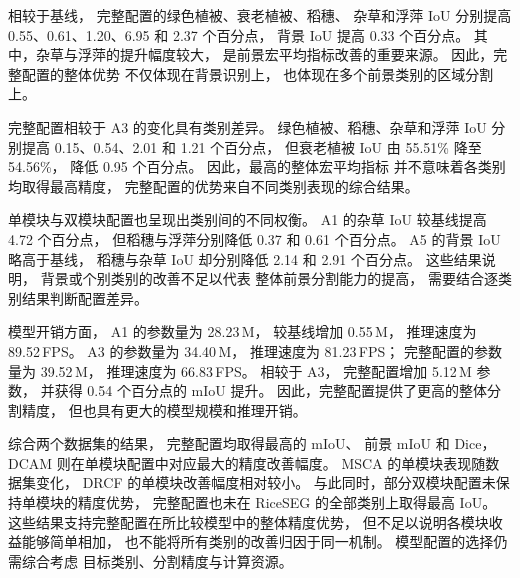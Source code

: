相较于基线，
完整配置的绿色植被、衰老植被、稻穗、
杂草和浮萍 IoU 分别提高
0.55、0.61、1.20、6.95 和 2.37 个百分点，
背景 IoU 提高 0.33 个百分点。
其中，杂草与浮萍的提升幅度较大，
是前景宏平均指标改善的重要来源。
因此，完整配置的整体优势
不仅体现在背景识别上，
也体现在多个前景类别的区域分割上。

完整配置相较于 A3 的变化具有类别差异。
绿色植被、稻穗、杂草和浮萍 IoU
分别提高 0.15、0.54、2.01 和 1.21 个百分点，
但衰老植被 IoU 由 55.51\% 降至 54.56\%，
降低 0.95 个百分点。
因此，最高的整体宏平均指标
并不意味着各类别均取得最高精度，
完整配置的优势来自不同类别表现的综合结果。

单模块与双模块配置也呈现出类别间的不同权衡。
A1 的杂草 IoU 较基线提高 4.72 个百分点，
但稻穗与浮萍分别降低 0.37 和 0.61 个百分点。
A5 的背景 IoU 略高于基线，
稻穗与杂草 IoU 却分别降低
2.14 和 2.91 个百分点。
这些结果说明，
背景或个别类别的改善不足以代表
整体前景分割能力的提高，
需要结合逐类别结果判断配置差异。

模型开销方面，
A1 的参数量为 28.23\,M，
较基线增加 0.55\,M，
推理速度为 89.52\,FPS。
A3 的参数量为 34.40\,M，
推理速度为 81.23\,FPS；
完整配置的参数量为 39.52\,M，
推理速度为 66.83\,FPS。
相较于 A3，
完整配置增加 5.12\,M 参数，
并获得 0.54 个百分点的 mIoU 提升。
因此，完整配置提供了更高的整体分割精度，
但也具有更大的模型规模和推理开销。

综合两个数据集的结果，
完整配置均取得最高的 mIoU、
前景 mIoU 和 Dice，
DCAM 则在单模块配置中对应最大的精度改善幅度。
MSCA 的单模块表现随数据集变化，
DRCF 的单模块改善幅度相对较小。
与此同时，部分双模块配置未保持单模块的精度优势，
完整配置也未在 RiceSEG 的全部类别上取得最高 IoU。
这些结果支持完整配置在所比较模型中的整体精度优势，
但不足以说明各模块收益能够简单相加，
也不能将所有类别的改善归因于同一机制。
模型配置的选择仍需综合考虑
目标类别、分割精度与计算资源。
\par
\endgroup